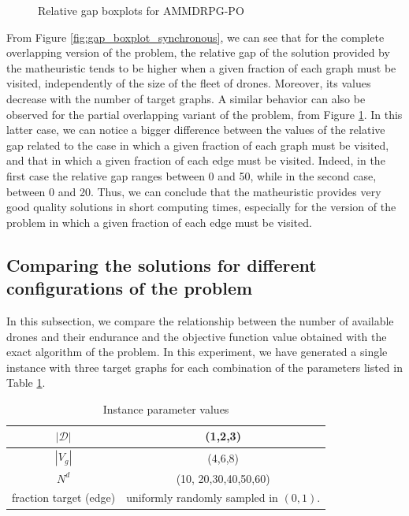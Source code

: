\documentclass[10pt,a4paper]{elsarticle}
\def\AMDPO{{\sf AMMDRPG-PO\xspace}}
\renewcommand{\arraystretch}{1.5}
\newcommand{\EN}[1]{{\color{black}#1}}
\begin{document}
\begin{figure}[h!]
	\caption{Relative gap boxplots for \AMDPO}
	\label{fig:gap_boxplot_asynchronous}
\end{figure}
\noindent
From Figure \ref{fig:gap_boxplot_synchronous}, we can see that for the complete overlapping version of the problem, the relative gap of the solution provided by the matheuristic tends to be higher when a given fraction of each graph must be visited, independently \EN{of} the size of the fleet of drones. Moreover, its values decrease with the number of target graphs. A similar \EN{behavior can also be} observed for the partial overlapping variant of the problem, from Figure \ref{fig:gap_boxplot_asynchronous}. In this latter case, we can notice a bigger difference between the values of the relative gap related to the case in which a given fraction of each graph must be visited, and \EN{that} in which a given fraction of each edge must be visited. Indeed, in the first case the relative gap ranges between 0 and 50, while in the second case, between 0 and 20. Thus, we can conclude that the matheuristic provides very good quality solutions in short computing time\EN{s}, especially for the version of the problem in which a given fraction of each edge must be visited.

\noindent

\subsection{Comparing the solutions for different configurations of the problem}
\noindent
In this subsection, we compare the relationship between the number of available drones and their endurance and the objective function value obtained with the exact algorithm of the problem. In this experiment, we have generated a single instance with three target graphs for each combination of the parameters listed in Table \ref{table:tab3}.

\renewcommand{\arraystretch}{0.7}
\begin{table}[!h]
\caption{Instance parameter values}
\centering
\footnotesize
\begin{tabular}{c | c }
\hline
$|\mathcal D|$ &	(1,2,3)\\
\hline
$|V_g|$ & (4,6,8)\\
\hline
$N^d$ & (10, 20,30,40,50,60)\\
\hline
fraction target (edge) & uniform\EN{ly} randomly sampled in $(0, 1)$.
\end{tabular}
\label{table:tab3}
\end{table}
\end{document}
